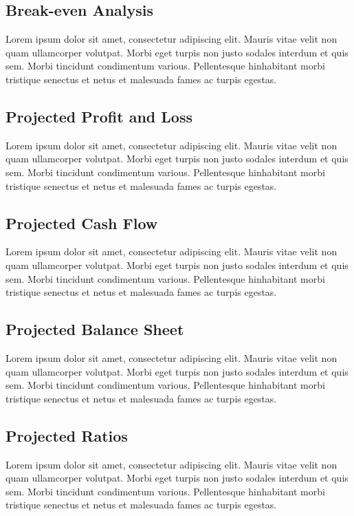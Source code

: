 \documentclass[11pt]{article}
\begin{document}
\subsection{Break-even Analysis}
Lorem ipsum dolor sit amet, consectetur adipiscing elit. Mauris vitae velit
non quam ullamcorper volutpat. Morbi eget turpis non justo sodales interdum
et quis sem. Morbi tincidunt condimentum various. Pellentesque hinhabitant morbi
tristique senectus et netus et malesuada fames ac turpis egestas.\newline
\subsection{Projected Profit and Loss}
Lorem ipsum dolor sit amet, consectetur adipiscing elit. Mauris vitae velit
non quam ullamcorper volutpat. Morbi eget turpis non justo sodales interdum
et quis sem. Morbi tincidunt condimentum various. Pellentesque hinhabitant morbi
tristique senectus et netus et malesuada fames ac turpis egestas.\newline
\subsection{Projected Cash Flow}
Lorem ipsum dolor sit amet, consectetur adipiscing elit. Mauris vitae velit
non quam ullamcorper volutpat. Morbi eget turpis non justo sodales interdum
et quis sem. Morbi tincidunt condimentum various. Pellentesque hinhabitant morbi
tristique senectus et netus et malesuada fames ac turpis egestas.\newline
\subsection{Projected Balance Sheet}
Lorem ipsum dolor sit amet, consectetur adipiscing elit. Mauris vitae velit
non quam ullamcorper volutpat. Morbi eget turpis non justo sodales interdum
et quis sem. Morbi tincidunt condimentum various. Pellentesque hinhabitant morbi
tristique senectus et netus et malesuada fames ac turpis egestas.\newline
\subsection{Projected Ratios}
Lorem ipsum dolor sit amet, consectetur adipiscing elit. Mauris vitae velit
non quam ullamcorper volutpat. Morbi eget turpis non justo sodales interdum
et quis sem. Morbi tincidunt condimentum various. Pellentesque hinhabitant morbi
tristique senectus et netus et malesuada fames ac turpis egestas.\newline
\pagebreak
\end{document}

